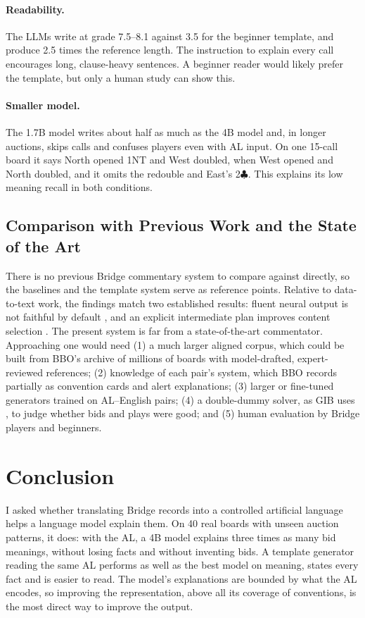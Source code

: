 \documentclass[11pt]{article}
\newcommand{\suitC}{$\clubsuit$}
\begin{document}
\paragraph{Readability.} The LLMs write at grade 7.5--8.1 against 3.5 for the beginner template, and produce 2.5 times the reference length. The instruction to explain every call encourages long, clause-heavy sentences. A beginner reader would likely prefer the template, but only a human study can show this.

\paragraph{Smaller model.} The 1.7B model writes about half as much as the 4B model and, in longer auctions, skips calls and confuses players even with AL input. On one 15-call board it says North opened 1NT and West doubled, when West opened and North doubled, and it omits the redouble and East's 2\suitC{}. This explains its low meaning recall in both conditions.

\subsection{Comparison with Previous Work and the State of the Art}

There is no previous Bridge commentary system to compare against directly, so the baselines and the template system serve as reference points. Relative to data-to-text work, the findings match two established results: fluent neural output is not faithful by default \citep{wiseman2017challenges}, and an explicit intermediate plan improves content selection \citep{puduppully2019content}. The present system is far from a state-of-the-art commentator. Approaching one would need (1) a much larger aligned corpus, which could be built from BBO's archive of millions of boards with model-drafted, expert-reviewed references; (2) knowledge of each pair's system, which BBO records partially as convention cards and alert explanations; (3) larger or fine-tuned generators \citep{kale2020text} trained on AL--English pairs; (4) a double-dummy solver, as GIB uses \citep{ginsberg2001gib}, to judge whether bids and plays were good; and (5) human evaluation by Bridge players and beginners.

\section{Conclusion}

I asked whether translating Bridge records into a controlled artificial language helps a language model explain them. On 40 real boards with unseen auction patterns, it does: with the AL, a 4B model explains three times as many bid meanings, without losing facts and without inventing bids. A template generator reading the same AL performs as well as the best model on meaning, states every fact and is easier to read. The model's explanations are bounded by what the AL encodes, so improving the representation, above all its coverage of conventions, is the most direct way to improve the output.
\end{document}
